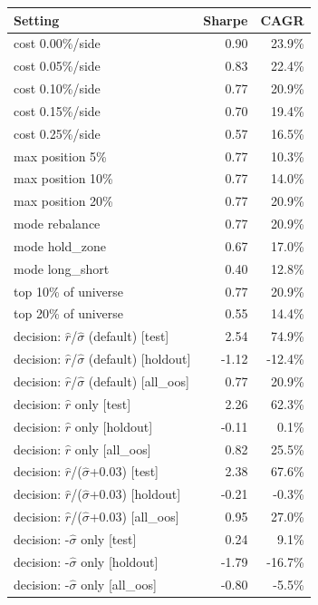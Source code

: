 \begin{tabular}{lrr}
\toprule
Setting & Sharpe & CAGR \\
\midrule
cost 0.00\%/side & 0.90 & 23.9\% \\
cost 0.05\%/side & 0.83 & 22.4\% \\
cost 0.10\%/side & 0.77 & 20.9\% \\
cost 0.15\%/side & 0.70 & 19.4\% \\
cost 0.25\%/side & 0.57 & 16.5\% \\
max position 5\% & 0.77 & 10.3\% \\
max position 10\% & 0.77 & 14.0\% \\
max position 20\% & 0.77 & 20.9\% \\
mode rebalance & 0.77 & 20.9\% \\
mode hold\_zone & 0.67 & 17.0\% \\
mode long\_short & 0.40 & 12.8\% \\
top 10\% of universe & 0.77 & 20.9\% \\
top 20\% of universe & 0.55 & 14.4\% \\
decision: $\hat r$/$\hat\sigma$ (default) {[}test{]} & 2.54 & 74.9\% \\
decision: $\hat r$/$\hat\sigma$ (default) {[}holdout{]} & -1.12 & -12.4\% \\
decision: $\hat r$/$\hat\sigma$ (default) {[}all\_oos{]} & 0.77 & 20.9\% \\
decision: $\hat r$ only {[}test{]} & 2.26 & 62.3\% \\
decision: $\hat r$ only {[}holdout{]} & -0.11 & 0.1\% \\
decision: $\hat r$ only {[}all\_oos{]} & 0.82 & 25.5\% \\
decision: $\hat r$/($\hat\sigma$+0.03) {[}test{]} & 2.38 & 67.6\% \\
decision: $\hat r$/($\hat\sigma$+0.03) {[}holdout{]} & -0.21 & -0.3\% \\
decision: $\hat r$/($\hat\sigma$+0.03) {[}all\_oos{]} & 0.95 & 27.0\% \\
decision: -$\hat\sigma$ only {[}test{]} & 0.24 & 9.1\% \\
decision: -$\hat\sigma$ only {[}holdout{]} & -1.79 & -16.7\% \\
decision: -$\hat\sigma$ only {[}all\_oos{]} & -0.80 & -5.5\% \\
\bottomrule
\end{tabular}
